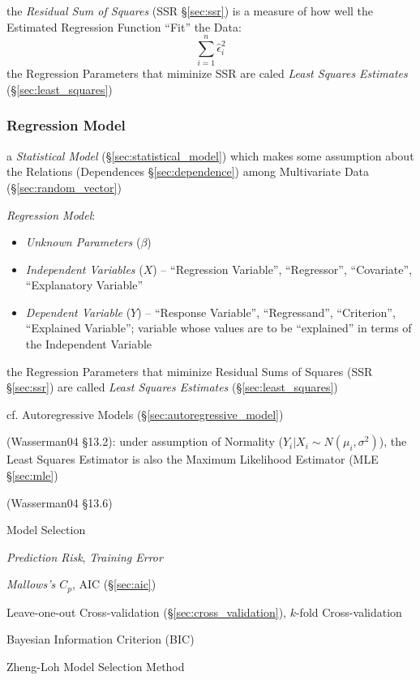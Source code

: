 the \emph{Residual Sum of Squares} (SSR \S\ref{sec:ssr}) is a measure of how
well the Estimated Regression Function ``Fit'' the Data:
\[
  \sum_{i=1}^n \hat{\epsilon}_i^2
\]
the Regression Parameters that miminize SSR are caled \emph{Least Squares
  Estimates} (\S\ref{sec:least_squares})



\subsubsection{Regression Model}\label{sec:regression_model}

a \emph{Statistical Model} (\S\ref{sec:statistical_model}) which makes some
assumption about the Relations (Dependences \S\ref{sec:dependence}) among
Multivariate Data (\S\ref{sec:random_vector})

\emph{Regression Model}:
\begin{itemize}
  \item \emph{Unknown Parameters} ($\beta$)
  \item \emph{Independent Variables} ($X$) -- ``Regression Variable'',
    ``Regressor'', ``Covariate'', ``Explanatory Variable''
  \item \emph{Dependent Variable} ($Y$) -- ``Response Variable'',
    ``Regressand'', ``Criterion'', ``Explained Variable''; variable whose values
    are to be ``explained'' in terms of the Independent Variable
\end{itemize}

the Regression Parameters that miminize Residual Sums of Squares (SSR
\S\ref{sec:ssr}) are called \emph{Least Squares Estimates}
(\S\ref{sec:least_squares})

cf. Autoregressive Models (\S\ref{sec:autoregressive_model})

(Wasserman04 \S13.2):
 under assumption of Normality ($Y_i | X_i \sim N(\mu_i, \sigma^2)$), the Least
 Squares Estimator is also the Maximum Likelihood Estimator (MLE
 \S\ref{sec:mle})

(Wasserman04 \S13.6)

Model Selection

\emph{Prediction Risk}, \emph{Training Error}

\emph{Mallows's $C_p$}, AIC (\S\ref{sec:aic})

Leave-one-out Cross-validation (\S\ref{sec:cross_validation}),
$k$-fold Cross-validation

Bayesian Information Criterion (BIC) %

Zheng-Loh Model Selection Method

